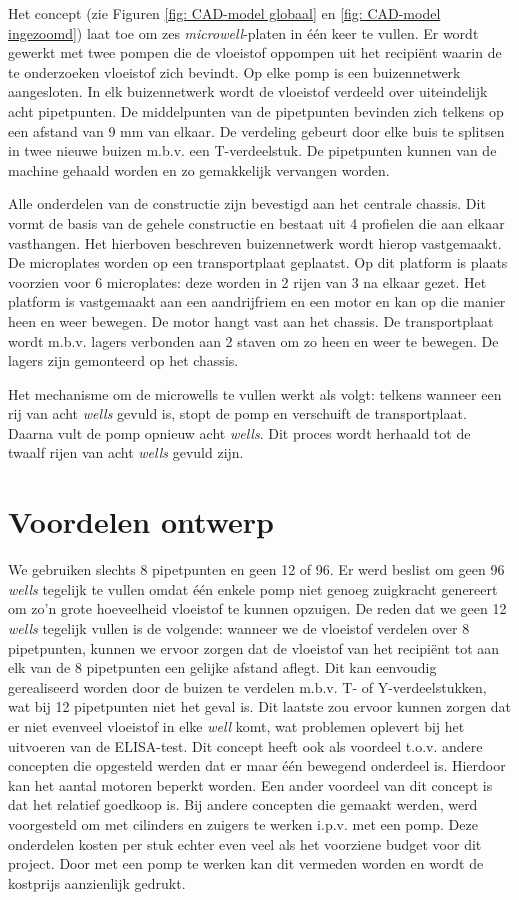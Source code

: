 \documentclass[a4paper,twoside,kulak]{kulakreport} %
\begin{document}
	Het concept (zie Figuren \ref{fig: CAD-model globaal} en \ref{fig: CAD-model ingezoomd}) laat toe om zes \textit{microwell}-platen in één keer te vullen. Er wordt gewerkt met twee pompen die de vloeistof oppompen uit het recipiënt waarin de te onderzoeken vloeistof zich bevindt. Op elke pomp is een buizennetwerk aangesloten. In elk buizennetwerk wordt de vloeistof verdeeld over uiteindelijk acht pipetpunten. De middelpunten van de pipetpunten bevinden zich telkens op een afstand van 9 mm van elkaar. De verdeling gebeurt door elke buis te splitsen in twee nieuwe buizen m.b.v. een T-verdeelstuk. De pipetpunten kunnen van de machine gehaald worden en zo gemakkelijk vervangen worden.
	
	Alle onderdelen van de constructie zijn bevestigd aan het centrale chassis. Dit vormt de basis van de gehele constructie en bestaat uit 4 profielen die aan elkaar vasthangen. Het hierboven beschreven buizennetwerk wordt hierop vastgemaakt.
	De microplates worden op een transportplaat geplaatst. Op dit platform is plaats voorzien voor 6 microplates: deze worden in 2 rijen van 3 na elkaar gezet. Het platform is vastgemaakt aan een aandrijfriem en een motor en kan op die manier heen en weer bewegen. De motor hangt vast aan het chassis. De transportplaat wordt m.b.v. lagers verbonden aan 2 staven om zo heen en weer te bewegen. De lagers zijn gemonteerd op het chassis.
	
	Het mechanisme om de microwells te vullen werkt als volgt: telkens wanneer een rij van acht \textit{wells} gevuld is, stopt de pomp en verschuift de transportplaat. Daarna vult de pomp opnieuw acht \textit{wells}. Dit proces wordt herhaald tot de twaalf rijen van acht \textit{wells} gevuld zijn. 
	
\section{Voordelen ontwerp}
	We gebruiken slechts 8 pipetpunten en geen 12 of 96. Er werd beslist om geen 96 \textit{wells} tegelijk te vullen omdat één enkele pomp niet genoeg zuigkracht genereert om zo'n grote hoeveelheid vloeistof te kunnen opzuigen. De reden dat we geen 12 \textit{wells} tegelijk vullen is de volgende: wanneer we de vloeistof verdelen over 8 pipetpunten, kunnen we ervoor zorgen dat de vloeistof van het recipiënt tot aan elk van de 8 pipetpunten een gelijke afstand aflegt. Dit kan eenvoudig gerealiseerd worden door de buizen te verdelen m.b.v. T- of Y-verdeelstukken, wat bij 12 pipetpunten niet het geval is. Dit laatste zou ervoor kunnen zorgen dat er niet evenveel vloeistof in elke \textit{well} komt, wat problemen oplevert bij het uitvoeren van de ELISA-test. Dit concept heeft ook als voordeel t.o.v. andere concepten die opgesteld werden dat er maar één bewegend onderdeel is. Hierdoor kan het aantal motoren beperkt worden. Een ander voordeel van dit concept is dat het relatief goedkoop is. Bij andere concepten die gemaakt werden, werd voorgesteld om met cilinders en zuigers te werken i.p.v. met een pomp. Deze onderdelen kosten per stuk echter even veel als het voorziene budget voor dit project. Door met een pomp te werken kan dit vermeden worden en wordt de kostprijs aanzienlijk gedrukt. 
	
\end{document}
